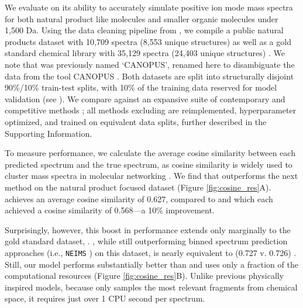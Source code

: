 \documentclass[journal=jcim,manuscript=article]{achemso}
\begin{document}
We evaluate \ourModel on its ability to accurately simulate positive ion mode mass spectra for both natural product like molecules and smaller organic molecules under 1,500 Da. Using the data cleaning pipeline from \cite{goldman_prefix-tree_2023}, we compile a public natural products dataset \gnpsData with 10,709 spectra (8,553 unique structures)  \cite{wang_sharing_2016, Goldman2023annotating, duhrkop_systematic_2021} as well as a gold standard chemical library \nistData with 35,129 spectra (24,403 unique structures) \cite{noauthor_tandem_nodate}. We note that \gnpsData was previously named `CANOPUS', renamed here to disambiguate the data from the tool CANOPUS \cite{duhrkop_systematic_2021}. Both datasets are split into structurally disjoint 90\%/10\% train-test splits, with 10\% of the training data reserved for model validation (see  ). We compare \ourModel against an expansive suite of contemporary and competitive methods \cite{allen_competitive_2015, hong20233DMolMS, murphy2023efficiently, wei_rapid_2019, zhu_using_2020, young_Massformer_2021, goldman_prefix-tree_2023}; all methods excluding \cfmModel are reimplemented, hyperparameter optimized, and trained on equivalent data splits, further described in the Supporting Information.


To measure performance, we calculate the average cosine similarity between each predicted spectrum and the true spectrum, as cosine similarity is widely used to cluster mass spectra in molecular networking \cite{nothias_feature-based_2020}. We find that \ourModel outperforms the next method \Massformer  on the natural product focused dataset (Figure \ref{fig:cosine_res}A). \ourModel achieves an average cosine similarity of 0.627, compared to \Massformer and \FixedVocab which each achieved a cosine similarity of 0.568---a 10\% improvement. 

Surprisingly, however, this boost in performance extends only marginally to the gold standard dataset, \nistData. \ourModel, while still outperforming binned spectrum prediction approaches (i.e., \texttt{NEIMS} \cite{wei_rapid_2019}) on this dataset, is nearly equivalent to \scarfModel  (0.727 v. 0.726) \cite{goldman_prefix-tree_2023}. Still, our model performs substantially better than \cfmModel and uses only a fraction of the computational resources (Figure \ref{fig:cosine_res}B). Unlike previous physically inspired models, because \ourModel only samples the most relevant fragments from chemical space, it requires just over 1 CPU second per spectrum.
\end{document}
